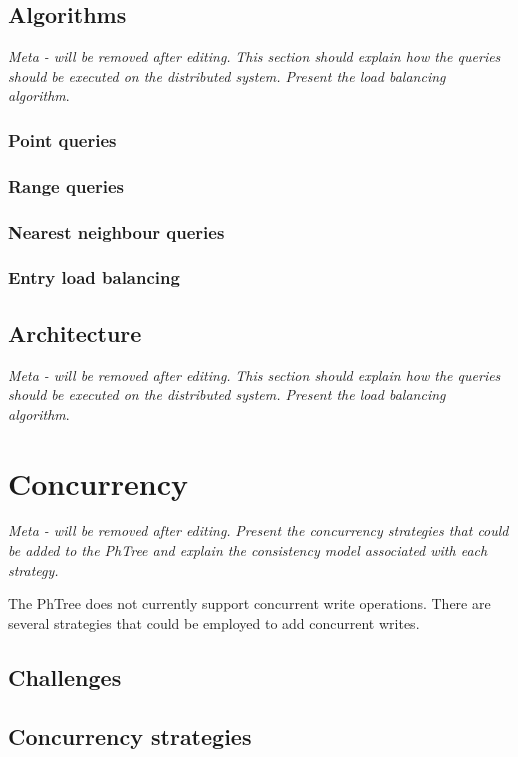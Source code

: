 \documentclass[11pt,a4paper]{globis-book}
\begin{document}
\section{Algorithms}

\textit{Meta - will be removed after editing.}
\textit{This section should explain how the queries should be executed on the distributed system. Present the load balancing algorithm}.
\subsection{Point queries}
\subsection{Range queries}
\subsection{Nearest neighbour queries}
\subsection{Entry load balancing}

\section{Architecture}

\textit{Meta - will be removed after editing.}
\textit{This section should explain how the queries should be executed on the distributed system. Present the load balancing algorithm}.

\chapter{Concurrency}

\textit{Meta - will be removed after editing.}
\textit{Present the concurrency strategies that could be added to the PhTree and explain the consistency model associated with each strategy.}

The PhTree does not currently support concurrent write operations. There are several strategies that could be employed to add concurrent writes.
\section{Challenges}
\section{Concurrency strategies}
\end{document}
